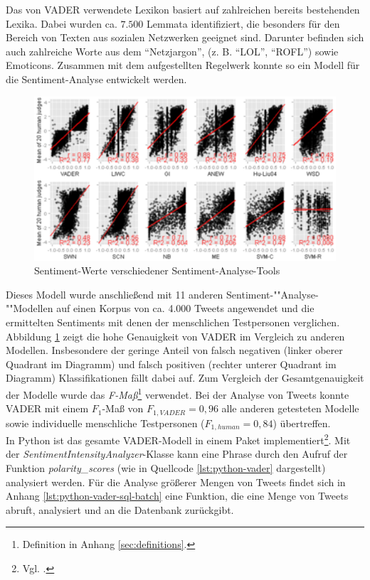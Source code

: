 \documentclass[
	a4paper,
	12pt,
	bibliography=totocnumbered,
	twoside,
]{scrreprt}
\begin{document}
Das von VADER verwendete Lexikon basiert auf zahlreichen bereits bestehenden Lexika. Dabei wurden ca. $7.500$ Lemmata identifiziert, die besonders für den Bereich von Texten aus sozialen Netzwerken geeignet sind. Darunter befinden sich auch zahlreiche Worte aus dem "`Netzjargon"', (z. B. "`LOL"', "`ROFL"') sowie Emoticons. Zusammen mit dem aufgestellten Regelwerk konnte so ein Modell für die Sentiment-Analyse entwickelt werden.\\


\begin{figure}[hbt!]
    \centering
    \includegraphics[width=.9\textwidth]{images/vader_comparison.eps}
    \caption[Sentiment-Werte verschiedener Sentiment-Analyse-Tools im Vergleich]{Sentiment-Werte verschiedener Sentiment-Analyse-Tools\footnotemark}
    \label{fig:vader-comparison}
\end{figure}

Dieses Modell wurde anschließend mit 11 anderen Sentiment-""Analyse-""Modellen auf einen Korpus von ca. 4.000 Tweets angewendet und die ermittelten Sentiments mit denen der menschlichen Testpersonen verglichen. Abbildung \ref{fig:vader-comparison} zeigt die hohe Genauigkeit von VADER im Vergleich zu anderen Modellen. Insbesondere der geringe Anteil von falsch negativen (linker oberer Quadrant im Diagramm) und falsch positiven (rechter unterer Quadrant im Diagramm) Klassifikationen fällt dabei auf. Zum Vergleich der Gesamtgenauigkeit der Modelle wurde das \textit{F-Maß}\footnote{Definition in Anhang \ref{sec:definitions}.} verwendet. Bei der Analyse von Tweets konnte VADER mit einem $F_1$-Maß von $F_{1, VADER} = 0,96$ alle anderen getesteten Modelle sowie individuelle menschliche Testpersonen ($F_{1, human} = 0,84$) übertreffen.\\

In Python ist das gesamte VADER-Modell in einem Paket implementiert\footnote{Vgl. \citet{vader}.}. Mit der \textit{SentimentIntensityAnalyzer}-Klasse kann eine Phrase durch den Aufruf der Funktion \textit{polarity\_scores} (wie in Quellcode \ref{lst:python-vader} dargestellt) analysiert werden. Für die Analyse größerer Mengen von Tweets findet sich in Anhang \ref{lst:python-vader-sql-batch} eine Funktion, die eine Menge von Tweets abruft, analysiert und an die Datenbank zurückgibt.
\end{document}
